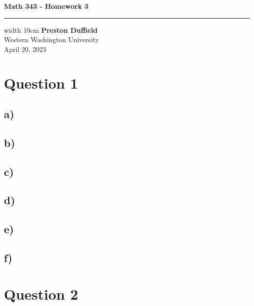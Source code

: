 \documentclass{article}
\begin{document}
\noindent
\begin{minipage}[t]{0.6\textwidth}
    \begin{flushleft}
        \LARGE\textbf{Math 343 - Homework 3} \\
        \vspace{6pt} %
        \hrule width 10cm
        \vspace{12pt}
        \large\textbf{Preston Duffield} \\
        \large Western Washington University \\
        April 20, 2023
        \vspace{24pt}
    \end{flushleft}
\end{minipage}

\section*{Question 1}
\subsection*{a)}
\subsection*{b)}
\subsection*{c)}
\subsection*{d)}
\subsection*{e)}
\subsection*{f)}

\clearpage
\section*{Question 2}
\end{document}
